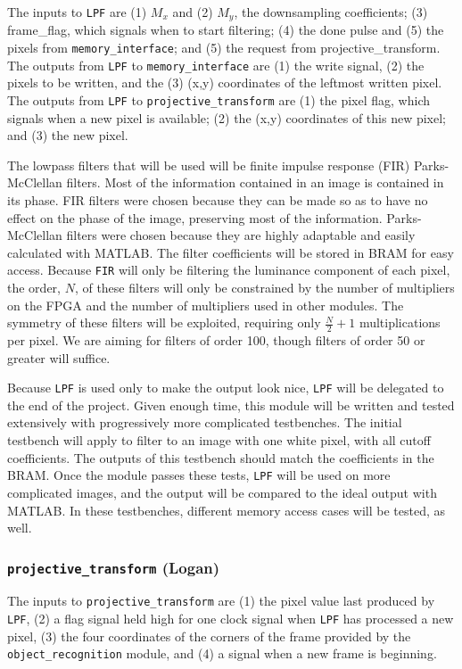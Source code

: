 \documentclass[10pt]{article}
\begin{document}
The inputs to {\tt LPF} are (1) \( M_x \) and (2) \( M_y \), the downsampling coefficients; (3) frame\_flag, which signals when to start filtering; (4) the done pulse and (5) the pixels from {\tt memory\_interface}; and (5) the request from {projective\_transform}. The outputs from {\tt LPF} to {\tt memory\_interface} are (1) the write signal, (2) the pixels to be written, and the (3) (x,y) coordinates of the leftmost written pixel. The outputs from {\tt LPF} to {\tt projective\_transform} are (1) the pixel flag, which signals when a new pixel is available; (2) the (x,y) coordinates of this new pixel; and (3) the new pixel.

The lowpass filters that will be used will be finite impulse response (FIR) Parks-McClellan filters. Most of the information contained in an image is contained in its phase. FIR filters were chosen because they can be made so as to have no effect on the phase of the image, preserving most of the information. Parks-McClellan filters were chosen because they are highly adaptable and easily calculated with MATLAB. The filter coefficients will be stored in BRAM for easy access. Because {\tt FIR} will only be filtering the luminance component of each pixel, the order, \( N \), of these filters will only be constrained by the number of multipliers on the FPGA and the number of multipliers used in other modules. The symmetry of these filters will be exploited, requiring only \( \frac{N}{2}+1 \) multiplications per pixel. We are aiming for filters of order 100, though filters of order 50 or greater will suffice.

Because {\tt LPF} is used only to make the output look nice, {\tt LPF} will be delegated to the end of the project. Given enough time, this module will be written and tested extensively with progressively more complicated testbenches. The initial testbench will apply to filter to an image with one white pixel, with all cutoff coefficients. The outputs of this testbench should match the coefficients in the BRAM. Once the module passes these tests, {\tt LPF} will be used on more complicated images, and the output will be compared to the ideal output with MATLAB. In these testbenches, different memory access cases will be tested, as well.

\subsubsection{{\tt projective\_transform} (Logan)}
The inputs to {\tt projective\_transform} are (1) the pixel value last produced by {\tt LPF}, (2) a flag signal held high for one clock signal when {\tt LPF} has processed a new pixel, (3) the four coordinates of the corners of the frame provided by the {\tt object\_recognition} module, and (4) a signal when a new frame is beginning.
\end{document}
